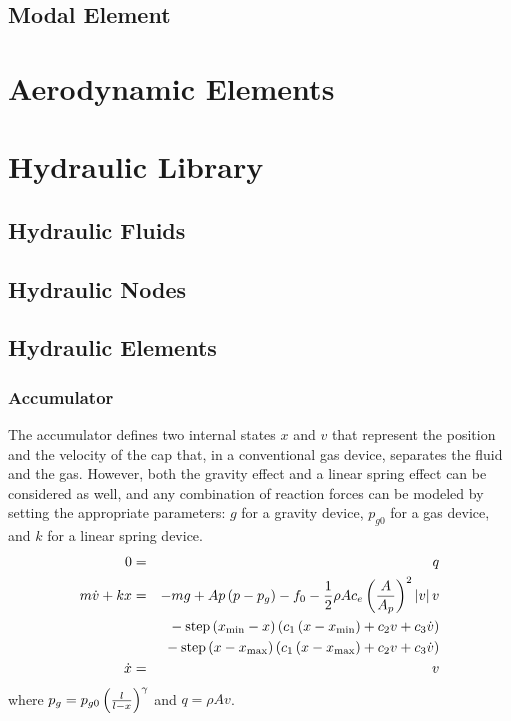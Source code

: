 \documentclass[10pt,dvips,fleqn,subeqn]{report}
\begin{document}
\section{Modal Element}





\chapter{Aerodynamic Elements}





\chapter{Hydraulic Library}
\section{Hydraulic Fluids}
\section{Hydraulic Nodes}

\section{Hydraulic Elements}

\subsection{Accumulator}
The accumulator defines two internal states $x$ and $v$ that represent 
the position and the velocity of the cap that, in a conventional
gas device, separates the fluid and the gas.
However, both the gravity effect and a linear spring effect
can be considered as well, and any combination of reaction forces
can be modeled by setting the appropriate parameters:
$g$ for a gravity device, $p_{g0}$ for a gas device, 
and $k$ for a linear spring device.
\begin{eqnarray*}
	0 & = & q \\
	m \dot{v} + k x & = & 
		- m g
		+ A p \left( p - p_g \right)
		- f_0 
		- \frac{1}{2} \rho A c_e \left( \frac{A}{A_p} \right)^2 \left| v \right| v \\
	& & \mbox{} - \mathrm{step}\left( x_{\mathrm{min}} - x \right)
		\left( c_1 \left( x - x_{\mathrm{min}} \right) + c_2 v + c_3 \dot{v} \right) \\
	& & \mbox{} - \mathrm{step}\left( x - x_{\mathrm{max}} \right)
		\left( c_1 \left( x - x_{\mathrm{max}} \right) + c_2 v + c_3 \dot{v} \right) \\
	\dot{x} & = & v
\end{eqnarray*}
where $p_g=p_{g0}\left( \frac{l}{l - x} \right)^{\gamma}$ and $q=\rho A v$.
\end{document}
